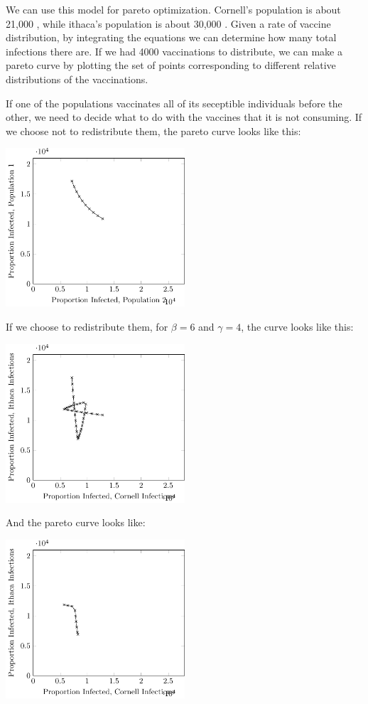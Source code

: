 \documentclass[titlepage]{article}
\begin{document}
We can use this model for pareto optimization.
Cornell's population is about 21,000 \cite{cornellpop},
	while ithaca's population is about 30,000 \cite{census}.
Given a rate of vaccine distribution, by integrating the equations
	we can determine how many total infections there are.
If we had 4000 vaccinations to distribute, we can make a pareto
	curve by plotting the set of points corresponding to different
	relative distributions of the vaccinations.

If one of the populations vaccinates all of its seceptible individuals
	before the other, we need to decide what to do with the vaccines
	that it is not consuming.
If we choose not to redistribute them, the pareto curve looks like this:

\includegraphics[width=0.5\textwidth]{figures/sir-pareto.pdf}

If we choose to redistribute them, for $\beta = 6$ and $\gamma = 4$,
	the curve looks like this:

\includegraphics[width=0.5\textwidth]{figures/sir-pareto-top.pdf}

And the pareto curve looks like:

\includegraphics[width=0.5\textwidth]{figures/sir-pareto-top-pareto.pdf}
\end{document}

